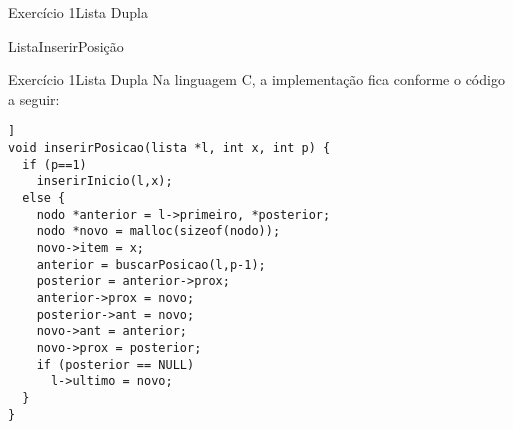 \documentclass[aspectratio=169]{beamer}
\begin{document}
\begin{frame}[fragile]{Exercício 1}{Lista Dupla}
\scalebox{0.6} {
\begin{algorithm}[H]
\caption{ListaInserirPosição} 
\label{ListaDuplaInserirPosicao}
\end{algorithm}
}%
\end{frame}


\begin{frame}[fragile]{Exercício 1}{Lista Dupla}
Na linguagem C, a implementação fica conforme o código a seguir:
\begin{lstlisting}[style=CStyle]]
void inserirPosicao(lista *l, int x, int p) {
  if (p==1) 
    inserirInicio(l,x);
  else {
    nodo *anterior = l->primeiro, *posterior;
    nodo *novo = malloc(sizeof(nodo));
    novo->item = x;      
    anterior = buscarPosicao(l,p-1);   
    posterior = anterior->prox;
    anterior->prox = novo;
    posterior->ant = novo;
    novo->ant = anterior;
    novo->prox = posterior;    
    if (posterior == NULL)
      l->ultimo = novo;
  }
}
\end{lstlisting}  
\end{frame}
\end{document}
